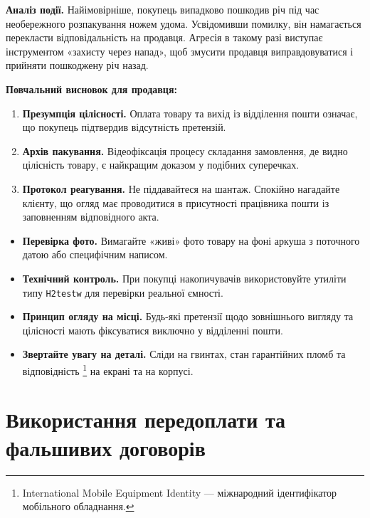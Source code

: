 \newpage 

\textbf{Аналіз події.} Найімовірніше, покупець випадково пошкодив річ під час необережного розпакування ножем удома. Усвідомивши помилку, він намагається перекласти відповідальність на продавця. Агресія в такому разі виступає інструментом «захисту через напад», щоб змусити продавця виправдовуватися і прийняти пошкоджену річ назад.

\vspace{0.1cm}
\textbf{Повчальний висновок для продавця:}
\begin{enumerate}
    \item \textbf{Презумпція цілісності.} Оплата товару та вихід із відділення пошти означає, що покупець підтвердив відсутність претензій. 
    \item \textbf{Архів пакування.} Відеофіксація процесу складання замовлення, де видно цілісність товару, є найкращим доказом у подібних суперечках.
    \item \textbf{Протокол реагування.} Не піддавайтеся на шантаж. Спокійно нагадайте клієнту, що огляд має проводитися в присутності працівника пошти із заповненням відповідного акта.
\end{enumerate}

\noindent{}

\begin{itemize}
    \item \textbf{Перевірка фото.} Вимагайте «живі» фото товару на фоні аркуша з поточного датою або специфічним написом.
    \item \textbf{Технічний контроль.} При покупці накопичувачів використовуйте утиліти типу \texttt{H2testw} для перевірки реальної ємності.
    \item \textbf{Принцип огляду на місці.} Будь-які претензії щодо зовнішнього вигляду та цілісності мають фіксуватися виключно у відділенні пошти. 
    \item \textbf{Звертайте увагу на деталі.} Сліди на гвинтах, стан гарантійних пломб та відповідність \footnote{International Mobile Equipment Identity — міжнародний ідентифікатор мобільного обладнання.} на екрані та на корпусі.
\end{itemize}

\newpage 

\chapter{Використання передоплати та фальшивих договорів}


